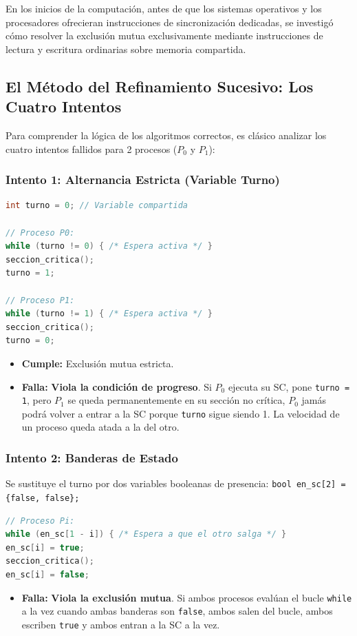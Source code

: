 En los inicios de la computación, antes de que los sistemas operativos y los procesadores ofrecieran instrucciones de sincronización dedicadas, se investigó cómo resolver la exclusión mutua exclusivamente mediante instrucciones de lectura y escritura ordinarias sobre memoria compartida.

\subsection{El Método del Refinamiento Sucesivo: Los Cuatro Intentos}
Para comprender la lógica de los algoritmos correctos, es clásico analizar los cuatro intentos fallidos para 2 procesos ($P_0$ y $P_1$):

\subsubsection{Intento 1: Alternancia Estricta (Variable Turno)}
\begin{lstlisting}[language=C++]
int turno = 0; // Variable compartida

// Proceso P0:
while (turno != 0) { /* Espera activa */ }
seccion_critica();
turno = 1;

// Proceso P1:
while (turno != 1) { /* Espera activa */ }
seccion_critica();
turno = 0;
\end{lstlisting}
\begin{itemize}
    \item \textbf{Cumple:} Exclusión mutua estricta.
    \item \textbf{Falla:} \textbf{Viola la condición de progreso}. Si $P_0$ ejecuta su SC, pone \texttt{turno = 1}, pero $P_1$ se queda permanentemente en su sección no crítica, $P_0$ jamás podrá volver a entrar a la SC porque \texttt{turno} sigue siendo 1. La velocidad de un proceso queda atada a la del otro.
\end{itemize}

\subsubsection{Intento 2: Banderas de Estado}
Se sustituye el turno por dos variables booleanas de presencia: \texttt{bool en\_sc[2] = \{false, false\};}
\begin{lstlisting}[language=C++]
// Proceso Pi:
while (en_sc[1 - i]) { /* Espera a que el otro salga */ }
en_sc[i] = true;
seccion_critica();
en_sc[i] = false;
\end{lstlisting}
\begin{itemize}
    \item \textbf{Falla:} \textbf{Viola la exclusión mutua}. Si ambos procesos evalúan el bucle \texttt{while} a la vez cuando ambas banderas son \texttt{false}, ambos salen del bucle, ambos escriben \texttt{true} y ambos entran a la SC a la vez.
\end{itemize}

